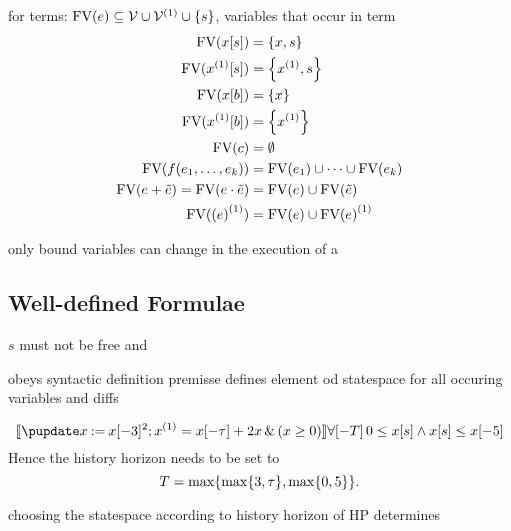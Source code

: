         \begin{definition}
            for terms: $\freevars{\astrm}\subseteq\allvars\cup\diffvars\cup\set{s}$, variables that occur in term
            \begin{align*}
                \freevars{\x[s]} &= \set{x,s}\\
                \freevars{\Dx[s]} &= \set{\D{x},s}\\
                \freevars{\x[b]} &= \set{x}\\
                \freevars{\Dx[b]} &= \set{\D{x}}\\
                \freevars{c} &= \emptyset\\
                \freevars{f(\range{\istrm{1}}{\istrm{k}})} &= \freevars{\istrm{1}} \cup\cdots\cup \freevars{\istrm{k}}\\
                \freevars{\astrm + \bstrm} = \freevars{\astrm \cdot \bstrm} &= \freevars{\astrm}\cup\freevars{\bstrm}\\
                \freevars{\D{(\astrm)}} &= \freevars{\astrm}\cup\D{\freevars{\astrm}}
            \end{align*}
                
        \end{definition} 

        only bound variables can change in the execution of a \HP   

    \subsection{Well-defined Formulae}
        \label{sec:well-definedness}
    
        $s$ must not be free
        and

        \begin{definition}
            obeys syntactic definition
            premisse defines element od statespace for all occuring variables and diffs
        \end{definition}

        \begin{example}
            \begin{equation*}
                \dbox{\hupdate{\humod{x}{\x[-3]^2}};\hevolvein{\D{x}=\x[-\tau]+2x}{(x\geq 0)}}{\hsc{0\leq \x[s] \land \x[s]\leq\x[-5]}}
            \end{equation*}
            Hence the history horizon needs to be set to
            \begin{equation*}
                T=\max\set{\max\set{3,\tau},\max\set{0,5}}.
            \end{equation*}
        \end{example}

        \begin{lemma}
            choosing the statespace according to history horizon of HP determines
        \end{lemma}

        \begin{example}
            
        \end{example}
